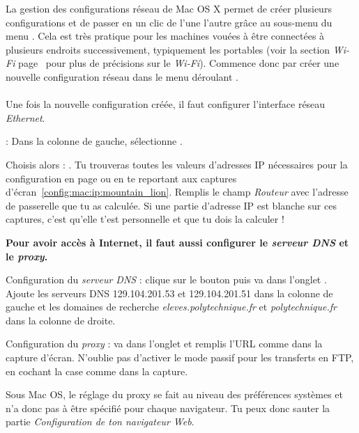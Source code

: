 
La gestion des configurations r\'eseau de Mac OS X permet de cr\'eer plusieurs configurations et de passer en un clic de l'une  l'autre gr\^ace au sous-menu  du menu . Cela est tr\`es pratique pour les machines vou\'ees \`a  \^etre connect\'ees \`a  plusieurs endroits successivement, typiquement les portables (voir la section \emph{Wi-Fi} page~\pageref{wifi} pour plus de pr\'ecisions sur le \emph{Wi-Fi}). Commence donc par cr\'eer une nouvelle configuration r\'eseau dans le menu d\'eroulant .
\\
\\
Une fois la nouvelle configuration cr\'e\'ee, il faut configurer l'interface r\'eseau \emph{Ethernet}.


 : Dans la colonne de gauche, s\'electionne .

Choisis alors  : . Tu trouveras toutes les valeurs d'adresses IP n\'ecessaires pour la configuration en page \pageref{calcul_ip} ou en te reportant aux captures d'\'ecran~\ref{config:mac:ip:mountain_lion}. Remplis le champ \emph{Routeur} avec l'adresse de passerelle que tu as calcul\'ee. Si une partie d'adresse IP est blanche sur ces captures, c'est qu'elle t'est personnelle et que tu dois la calculer !


  
  

\vspace{4mm}

\textbf{Pour avoir acc\`es \`a  Internet, il faut aussi configurer le \emph{serveur DNS} et le \emph{proxy}.}

Configuration du \emph{serveur DNS} : clique sur le bouton  puis va dans l'onglet . Ajoute les serveurs DNS 129.104.201.53 et 129.104.201.51 dans la colonne de gauche et les domaines de recherche \emph{eleves.polytechnique.fr} et \emph{polytechnique.fr} dans la colonne de droite.



Configuration du \emph{proxy} : va dans l'onglet  et remplis l'URL comme dans la capture d'\'ecran. N'oublie pas d'activer le mode passif pour les transferts en FTP, en cochant la case comme dans la capture.

Sous Mac OS, le r\'eglage du proxy se fait au niveau des pr\'ef\'erences syst\`emes et n'a donc pas \`a \^etre sp\'ecifi\'e pour chaque navigateur. Tu peux donc sauter la partie \emph{Configuration de ton navigateur Web}.



